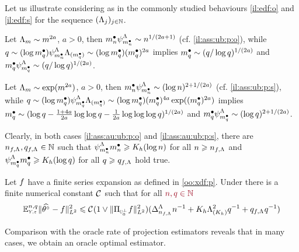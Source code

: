 \begin{il}\label{il:ass:au:ub:p}
Let us illustrate  considering as in  the commonly studied behaviours \ref{il:edf:o} and \ref{il:edf:s} for the sequence  $\Nsuite[j]{\iSv[j]}$.
\begin{Liste}[]
\item[\mylabel{il:ass:au:ub:p:o}{\dg\bfseries{(o)}}]
	Let $\iSv[\Di]\sim \Di^{2a}$, $a>0$, then $\sDi{\ssY}\cmSv[\sDi{\ssY}]\sim\ssY^{1/(2a+1)}$ (cf.  \ref{il:ass:ub:p:o}), while $\ssE\sim(\log\sDi{\ssE})\cmSv[\sDi{\ssY}]\miSv[\sDi{\ssE}]\sim(\log\sDi{\ssE})(\sDi{\ssE})^{2a}$ implies $\sDi{\ssE}\sim(\ssE/\log\ssE)^{1/(2a)}$ and $\sDi{\ssE}\cmSv[\sDi{\ssE}]\sim (\ssE/\log\ssE)^{1/(2a)}$.
\item[\mylabel{il:ass:au:ub:p:s}{\dg\bfseries{(s)}}]
	Let $\iSv[\Di]\sim \exp(\Di^{2a})$, $a>0$, then $\sDi{\ssY}\cmSv[\sDi{\ssY}]\sim (\log \ssY)^{2+1/(2a)}$ (cf.  \ref{il:ass:ub:p:s}), while $\ssE\sim(\log\sDi{\ssE})\cmSv[\sDi{\ssE}]\miSv[\sDi{\ssE}]\sim (\log\sDi{\ssE})(\sDi{\ssE})^{4a}\exp((\sDi{\ssE})^{2a})$ implies $\sDi{\ssE}\sim(\log \ssE-\tfrac{1+4a}{2a}\log\log\ssE-\tfrac{1}{2a}\log\log\log\ssE)^{1/(2a)}$ and $\sDi{\ssE}\cmSv[\sDi{\ssE}]\sim (\log \ssE)^{2+1/(2a)}$.
\end{Liste}
Clearly, in both cases \ref{il:ass:au:ub:p:o} and \ref{il:ass:au:ub:p:s}, there are ${\ssY}_{\xdf,\iSv},{\ssE}_{\xdf,\iSv}\in\Nz$ such that $\cmiSv[\sDi{\ssY}]\sDi{\ssY}\geq K_{\ydf}(\log\ssY)$ for all $\ssY\geq{\ssY}_{\xdf,\iSv}$ and  $\cmiSv[\sDi{\ssE}]\sDi{\ssE}\geq K_{\ydf}(\log\ssE)$ for all $\ssE\geq{\ssE}_{\xdf,\iSv}$  hold true.
\end{il}


\begin{thm}\label{THM_FREQ_CIRCDECONV_UNKNOWN_IID_ORACLE_P}
Let $\xdf$ have a finite series expansion as defined in \ref{oo:xdf:p}.
Under  there is a finite numerical constant $\cst{}$ such that for all $\dr\ssY,\ssE\in\Nz$
\begin{equation}\label{re:au:ub:p:e1}
\FuEx[\ssY,\ssE]{\rY,\rE}\VnormLp{\hxdf-\xdf}^2
\leq\cst{}(1\vee\VnormLp{\Proj[{\mHiH[0]^\perp}]\xdf}^2)(\DipenSv[\ssY_{\xdf,\iSv}]\ssY^{-1}+K_{\ydf}\miSv[K_{\ydf}]^2\ssE^{-1}+\ssE_{\xdf,\iSv}\ssE^{-1})
\end{equation}
\end{thm}

Comparison with the oracle rate of projection estimators reveals that in many cases, we obtain an oracle optimal estimator.

